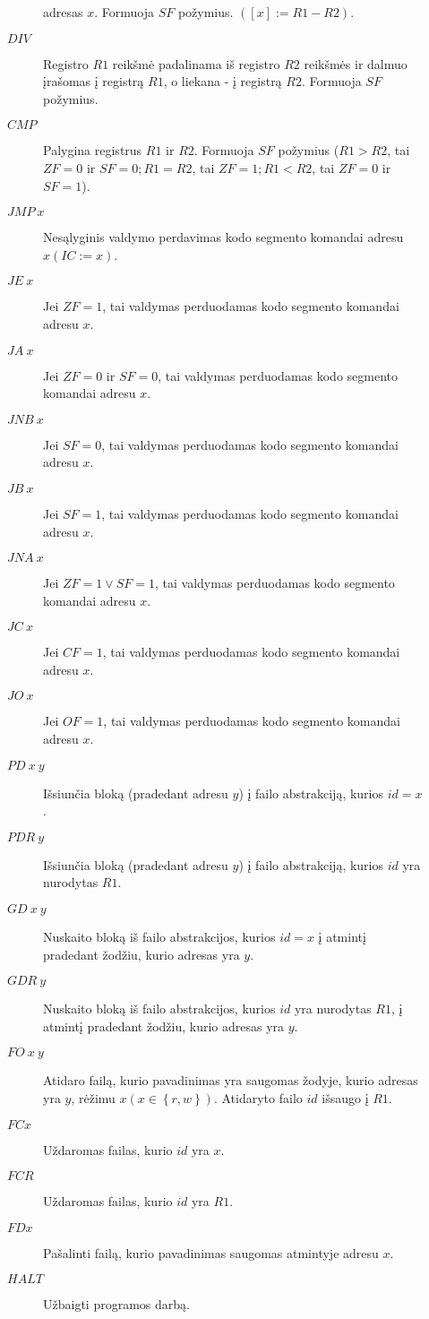 \begin{description}
\begin{description}
          adresas $x$. Formuoja $SF$ požymius. $([x]:=R1-R2)$.
        \item[$DIV$] Registro $R1$ reikšmė padalinama iš registro $R2$ 
          reikšmės ir dalmuo įrašomas į registrą $R1$, o liekana - į 
          registrą $R2$. Formuoja $SF$ požymius.
        \item[$CMP$] Palygina registrus $R1$ ir $R2$. Formuoja $SF$ požymius
          ($R1>R2$, tai $ZF=0$ ir $SF=0; R1=R2$, tai $ZF=1; R1<R2$, 
          tai $ZF=0$ ir $SF=1$).
        \item[$JMP \: x$] Nesąlyginis valdymo perdavimas kodo segmento 
          komandai adresu  $x (IC:=x)$.
        \item[$JE \: x$] Jei $ZF=1$, tai valdymas perduodamas kodo segmento 
          komandai adresu $x$.
        \item[$JA \: x$] Jei $ZF=0$ ir $SF=0$, tai valdymas perduodamas kodo
          segmento komandai adresu $x$.
        \item[$JNB \: x$] Jei $SF=0$, tai valdymas perduodamas 
          kodo segmento komandai adresu $x$.
        \item[$JB \: x$] Jei $SF=1$, tai valdymas perduodamas kodo segmento
          komandai adresu $x$.
        \item[$JNA \: x$] Jei $ZF = 1 \lor SF=1$, tai valdymas perduodamas 
          kodo segmento komandai adresu $x$.
        \item[$JC \: x$] Jei $CF = 1$, tai valdymas perduodamas kodo 
          segmento komandai adresu $x$.
        \item[$JO \: x$] Jei $OF = 1$, tai valdymas perduodamas kodo 
          segmento komandai adresu $x$.
        \item[$PD \: x \: y$] Išsiunčia bloką (pradedant adresu 
          $y$) į failo abstrakciją, kurios $id = x$.
        \item[$PDR \: y$] Išsiunčia bloką (pradedant adresu 
          $y$) į failo abstrakciją, kurios $id$ yra nurodytas $R1$.
        \item[$GD \: x \: y$] Nuskaito bloką iš failo abstrakcijos, kurios
          $id = x$ į atmintį pradedant žodžiu, kurio adresas yra $y$.
        \item[$GDR \: y$] Nuskaito bloką iš failo abstrakcijos, kurios
          $id$ yra nurodytas $R1$, į atmintį pradedant žodžiu, kurio 
          adresas yra $y$.
        \item[$FO \: x \: y$] Atidaro failą, kurio pavadinimas yra saugomas
          žodyje, kurio adresas yra $y$, rėžimu 
          $x (x \in \left\{ r, w \right\})$. Atidaryto failo $id$ 
          išsaugo į $R1$.
        \item[$FC x$] Uždaromas failas, kurio $id$ yra $x$.
        \item[$FCR$] Uždaromas failas, kurio $id$ yra $R1$.
        \item[$FD x$] Pašalinti failą, kurio pavadinimas saugomas atmintyje
          adresu $x$.
        \item[$HALT$] Užbaigti programos darbą.
    \end{description}
  \end{description} 
  
